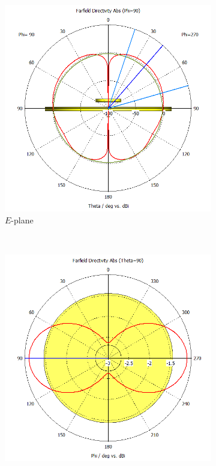 \documentclass[11pt,a4paper]{article}
\begin{document}
        \begin{figure}[!ht]
            \centering
            \begin{subfigure}{.4\textwidth}
                \centering
                \includegraphics[width=\textwidth]{src/lambda-twentieth-radiation-e.png}
                \caption{\label{fig:lambda-twentieth-radiation-e}$E$-plane}
            \end{subfigure}
            ~
            \begin{subfigure}{.4\textwidth}
                \centering
                \includegraphics[width=\textwidth]{src/lambda-twentieth-radiation-h.png}

\end{subfigure}
\end{figure}
\end{document}
